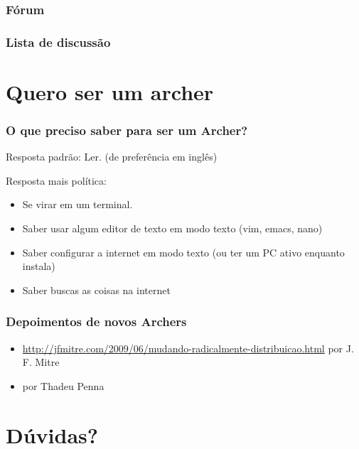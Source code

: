\documentclass{beamer}
\begin{document}
\begin{frame}
    \frametitle{Fórum}

\end{frame}

\begin{frame}
    \frametitle{Lista de discussão} 
\end{frame}

\section{Quero ser um archer }
    
\begin{frame}
    \frametitle{O que preciso saber para ser um Archer?}
    \begin{block}{Resposta padrão:}
        Ler. (de preferência em inglês)
    \end{block}
    \begin{block}{Resposta mais política:}
        \begin{itemize}
            \item Se virar em um terminal. 
            \item Saber usar algum editor de texto em modo texto (vim, emacs, nano) 
            \item Saber configurar a internet em modo texto (ou ter um PC ativo enquanto instala)
            \item Saber buscas as coisas na internet 
        \end{itemize}
    \end{block}
\end{frame}

\begin{frame}
        \frametitle{Depoimentos de novos Archers}
        \begin{block}
            \begin{itemize}
                \item \url{http://jfmitre.com/2009/06/mudando-radicalmente-distribuicao.html} por J. F. Mitre
                \item por Thadeu Penna
            \end{itemize}
        \end{block}


\end{frame}


\section{Dúvidas?}
\end{document}
